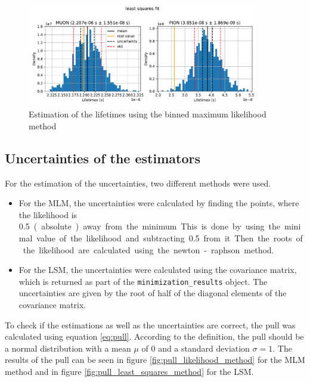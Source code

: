 \documentclass[11pt, a4paper, oneside]{book}
\newcommand\DoublePlotwidth{0.9}
\begin{document}
\begin{figure}[H]
  \centering
  \includegraphics[width=\DoublePlotwidth\textwidth]{images/estimators_hist_least_squares.pdf}
  \caption{Estimation of the lifetimes using the binned maximum likelihood method}

  \label{fig:least_squares_results}
\end{figure}


\subsection{Uncertainties of the estimators}
For the estimation of the uncertainties, two different methods were used. 
\begin{itemize}
    \item For the MLM, the uncertainties were calculated by finding the points, where the likelihood is \qty{0.5} (absolute) away from the minimum. This is done by using the minimal value of the likelihood and subtracting \qty{0.5} from it. Then the roots of the likelihood are calculated using the newton-raphson method. 
    \item For the LSM, the uncertainties were calculated using the covariance matrix, which is returned as part of the \lstinline{minimization_results} object. The uncertainties are given by the root of half of the diagonal elements of the covariance matrix.
\end{itemize}

To check if the estimations as well as the uncertainties are correct, the pull was calculated using equation \ref{eq:pull}. According to the definition, the pull should be a normal distribution with a mean $\mu$ of 0 and a standard deviation $\sigma = 1$. The results of the pull can be seen in figure \ref{fig:pull_likelihood_method} for the MLM method and in figure \ref{fig:pull_least_squares_method} for the LSM. 
\end{document}
